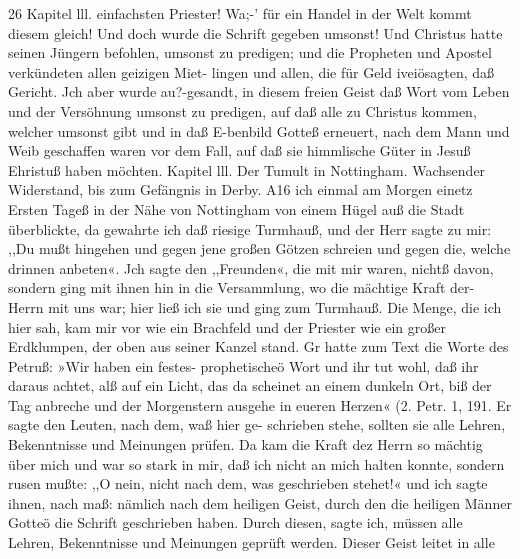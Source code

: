 26 Kapitel lll.
einfachsten Priester! Wa;-’ für ein Handel in der Welt kommt
diesem gleich! Und doch wurde die Schrift gegeben umsonst! Und
Christus hatte seinen Jüngern befohlen, umsonst zu predigen;
und die Propheten und Apostel verkündeten allen geizigen Miet-
lingen und allen, die für Geld iveiösagten, daß Gericht. Jch
aber wurde au?-gesandt, in diesem freien Geist daß Wort vom
Leben und der Versöhnung umsonst zu predigen, auf daß alle zu
Christus kommen, welcher umsonst gibt und in daß E-benbild
Gotteß erneuert, nach dem Mann und Weib geschaffen waren
vor dem Fall, auf daß sie himmlische Güter in Jesuß Ehristuß
haben möchten.
Kapitel lll.
Der Tumult in Nottingham. Wachsender Widerstand, bis zum
Gefängnis in Derby.
A16 ich einmal am Morgen einetz Ersten Tageß in der Nähe
von Nottingham von einem Hügel auß die Stadt überblickte, da
gewahrte ich daß riesige Turmhauß, und der Herr sagte zu mir:
,,Du mußt hingehen und gegen jene großen Götzen schreien und
gegen die, welche drinnen anbeten«. Jch sagte den ,,Freunden«,
die mit mir waren, nichtß davon, sondern ging mit ihnen hin in
die Versammlung, wo die mächtige Kraft der- Herrn mit uns
war; hier ließ ich sie und ging zum Turmhauß. Die Menge,
die ich hier sah, kam mir vor wie ein Brachfeld und der Priester
wie ein großer Erdklumpen, der oben aus seiner Kanzel stand.
Gr hatte zum Text die Worte des Petruß: »Wir haben ein festes-
prophetischeö Wort und ihr tut wohl, daß ihr daraus achtet, alß
auf ein Licht, das da scheinet an einem dunkeln Ort, biß der Tag
anbreche und der Morgenstern ausgehe in eueren Herzen«
(2. Petr. 1, 191. Er sagte den Leuten, nach dem, waß hier ge-
schrieben stehe, sollten sie alle Lehren, Bekenntnisse und Meinungen
prüfen. Da kam die Kraft dez Herrn so mächtig über mich und
war so stark in mir, daß ich nicht an mich halten konnte, sondern
rusen mußte: ,,O nein, nicht nach dem, was geschrieben stehet!«
und ich sagte ihnen, nach maß: nämlich nach dem heiligen Geist,
durch den die heiligen Männer Gotteö die Schrift geschrieben
haben. Durch diesen, sagte ich, müssen alle Lehren, Bekenntnisse
und Meinungen geprüft werden. Dieser Geist leitet in alle


